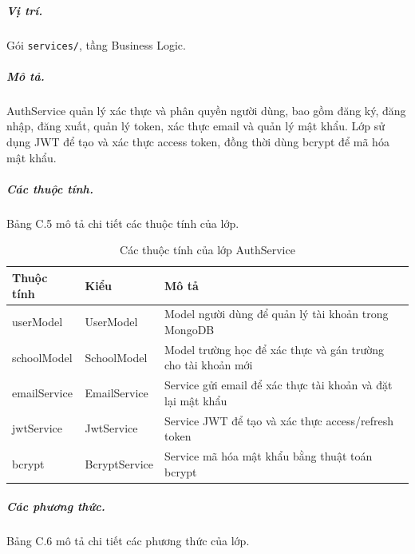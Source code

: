 \documentclass[../DoAn.tex]{subfiles}
\begin{document}
\subparagraph{Vị trí.} Gói \texttt{services/}, tầng Business Logic.

\subparagraph{Mô tả.} AuthService quản lý xác thực và phân quyền người dùng, bao gồm đăng ký, đăng nhập, đăng xuất, quản lý token, xác thực email và quản lý mật khẩu. Lớp sử dụng JWT để tạo và xác thực access token, đồng thời dùng bcrypt để mã hóa mật khẩu.

\subparagraph{Các thuộc tính.} Bảng C.5 mô tả chi tiết các thuộc tính của lớp.

\begin{table}[H]
\centering
\begin{tabular}{|p{4cm}|p{3.5cm}|p{5cm}|}
\hline
\textbf{Thuộc tính} & \textbf{Kiểu} & \textbf{Mô tả} \\ \hline
userModel & UserModel & Model người dùng để quản lý tài khoản trong MongoDB \\ \hline
schoolModel & SchoolModel & Model trường học để xác thực và gán trường cho tài khoản mới \\ \hline
emailService & EmailService & Service gửi email để xác thực tài khoản và đặt lại mật khẩu \\ \hline
jwtService & JwtService & Service JWT để tạo và xác thực access/refresh token \\ \hline
bcrypt & BcryptService & Service mã hóa mật khẩu bằng thuật toán bcrypt \\ \hline
\end{tabular}
\caption{Các thuộc tính của lớp AuthService}
\label{table:auth_service_attrs}
\end{table}

\subparagraph{Các phương thức.} Bảng C.6 mô tả chi tiết các phương thức của lớp.
\end{document}
